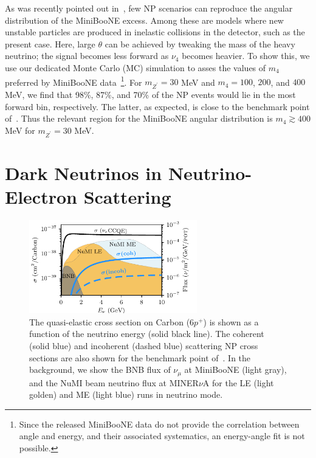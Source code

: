 As was recently pointed out in~\cite{Jordan:2018qiy}, few NP scenarios can reproduce the angular distribution of the MiniBooNE excess. Among these are models where new unstable particles are produced in inelastic collisions in the detector, such as the present case.
Here, large $\theta$ can be achieved by tweaking the mass of the heavy neutrino; the signal becomes less forward as $\nu_4$ becomes heavier.
To show this, we use our dedicated Monte Carlo (MC) simulation to asses the values of $m_4$ preferred by MiniBooNE data~\footnote{Since the released MiniBooNE data do not provide the correlation between angle and energy, and their associated systematics, an energy-angle fit is not possible.}. For $m_{Z^\prime} = 30$ MeV and $m_4 = 100$, $200$, and $400$ MeV, we find that 98\%, 87\%, and 70\% of the NP events would lie in the most forward bin, respectively. 
The latter, as expected, is close to the benchmark point of~\cite{Bertuzzo:2018itn}. Thus the relevant region for the MiniBooNE angular distribution is $m_4 \gtrsim 400$ MeV for $m_{Z^\prime} = 30$ MeV.
 
\section{Dark Neutrinos in Neutrino-Electron Scattering}
\begin{figure}[t!]
    \centering
    \includegraphics[width=0.65\textwidth]{cross_sections.pdf}
    \caption[Upscattering total cross section.]{The quasi-elastic cross section on Carbon ($6p^+$) is shown as a function of the neutrino energy (solid black line). The coherent (solid blue) and incoherent (dashed blue) scattering NP cross sections are also shown for the benchmark point of~\cite{Bertuzzo:2018itn}. In the background, we show the BNB flux of $\nu_\mu$ at MiniBooNE (light gray), and the NuMI beam neutrino flux at MINER$\nu$A for the LE (light golden) and ME (light blue) runs in neutrino mode.\label{fig:cross_section}}
\end{figure}

